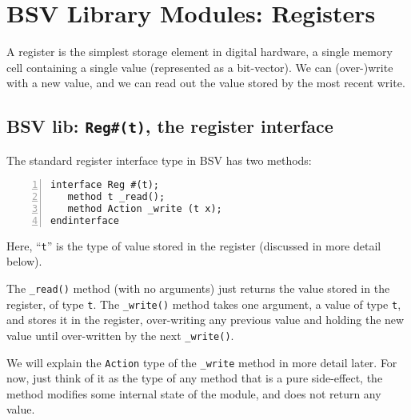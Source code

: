 
\section{BSV Library Modules: Registers}


A register is the simplest storage element in digital hardware, a
single memory cell containing a single value (represented as a
bit-vector).  We can (over-)write with a new value, and we can read
out the value stored by the most recent write.


\subsection{BSV lib: {\tt Reg\#(t)}, the register interface}

\label{Sec_Register_interface}


The standard register interface type in BSV has two methods:

{\small
\begin{Verbatim}[frame=single, numbers=left]
interface Reg #(t);
   method t _read();
   method Action _write (t x);
endinterface
\end{Verbatim}
}

Here, ``\verb|t|'' is the type of value stored in the register
(discussed in more detail below).

The \verb|_read()| method (with no arguments) just returns the value
stored in the register, of type \verb|t|.  The \verb|_write()| method
takes one argument, a value of type \verb|t|, and stores it in the
register, over-writing any previous value and holding the new value
until over-written by the next \verb|_write()|.


We will explain the {\tt Action} type of the {\tt \_write} method in
more detail later.  For now, just think of it as the type of any
method that is a pure side-effect, {\ie} the method modifies some
internal state of the module, and does not return any value.

